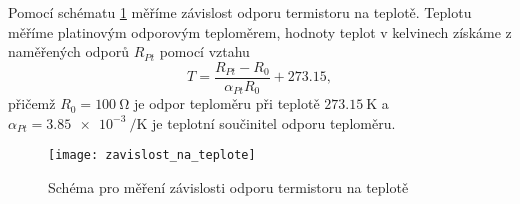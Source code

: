 \documentclass[0-protokol.tex]{subfiles}
\begin{document}
Pomocí schématu \ref{fig:zavislost_na_teplote} měříme závislost odporu termistoru na teplotě. Teplotu měříme platinovým odporovým teploměrem, hodnoty teplot v kelvinech získáme z naměřených odporů $R_{Pt}$ pomocí vztahu
\begin{equation} \label{eq:teplota_z_odporu}
T = \frac{R_{Pt} - R_0}{\alpha_{Pt}R_0} + \num{273.15},
\end{equation}
přičemž $R_0 = \SI{100}{\ohm}$ je odpor teploměru při teplotě $\SI{273.15}{\kelvin}$ a $\alpha_{Pt} = \SI{3.85e-3}{\per\kelvin}$ je teplotní součinitel odporu teploměru.

\begin{figure}[H]
\centering
\texttt{[image: zavislost\_na\_teplote]}
\caption{Schéma pro měření závislosti odporu termistoru na teplotě}
\label{fig:zavislost_na_teplote}
\end{figure}
\end{document}
